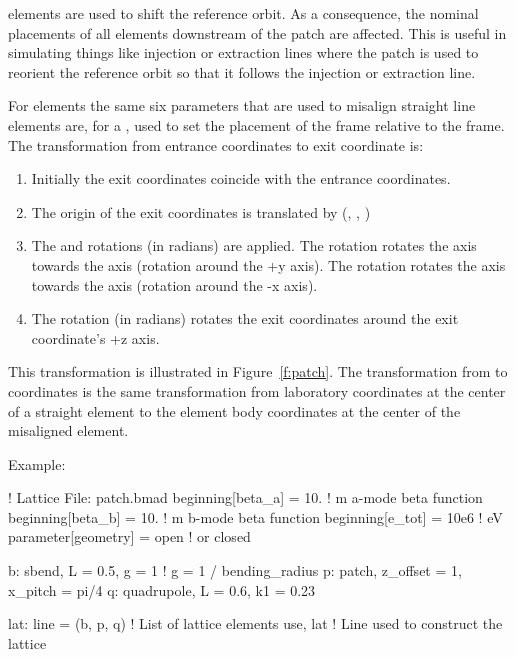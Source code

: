 \documentclass{hitec}     %
\begin{document}
 elements are used to shift the reference orbit. As a consequence, the nominal placements
of all elements downstream of the patch are affected. This is useful in simulating things like injection
or extraction lines where the patch is used to reorient the reference orbit so that it follows the 
injection or extraction line.

For  elements the same six parameters that are used to misalign straight line elements
are, for a , used to set the placement of the  frame relative to the 
frame. The transformation from entrance coordinates to exit coordinate is:
\vspace{-5 pt}
\begin{enumerate}
\item Initially the exit coordinates coincide with the entrance coordinates.
\item The origin of the exit coordinates is translated by (, , )
\item The  and  rotations (in radians) are applied. 
The  rotation rotates the  axis
towards the  axis (rotation around the +y axis). The  rotation rotates the  axis
towards the  axis (rotation around the -x axis).
\item The  rotation (in radians) rotates the exit coordinates around the exit coordinate's +z
axis.
\end{enumerate}
This transformation is illustrated in Figure~\ref{f:patch}. The transformation from 
 to  coordinates is the same transformation from laboratory coordinates at the
center of a straight element to the element body coordinates at the center of the misaligned
element.

\newpage

Example:
\begin{code}
! Lattice File: patch.bmad
beginning[beta_a] = 10.   ! m  a-mode beta function
beginning[beta_b] = 10.   ! m  b-mode beta function
beginning[e_tot] = 10e6   ! eV
parameter[geometry] = open  ! or closed

b: sbend, L = 0.5, g = 1    ! g = 1 / bending_radius
p: patch, z_offset = 1, x_pitch = pi/4
q: quadrupole, L = 0.6, k1 = 0.23

lat: line = (b, p, q)   ! List of lattice elements
use, lat                ! Line used to construct the lattice
\end{code}
\end{document}
